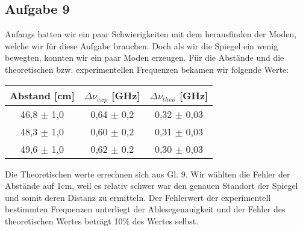 \subsection{Aufgabe 9}

Anfangs hatten wir ein paar Schwierigkeiten mit dem herausfinden der Moden, welche wir für diese Aufgabe brauchen. Doch als wir die Spiegel ein wenig bewegten, konnten wir ein paar Moden erzeugen.
Für die Abstände und die theoretischen bzw. experimentellen Frequenzen bekamen wir folgende Werte:

\begin{center}
\begin{tabular}{c | c | c}
Abstand [cm] & $\Delta \nu_{exp}$ [GHz] & $\Delta \nu_{theo}$ [GHz]\\ \hline
46,8 $\pm$ 1,0 & 0,64 $\pm$ 0,2 & 0,32 $\pm$ 0,03 \\ 
48,3 $\pm$ 1,0 & 0,60 $\pm$ 0,2 & 0,31 $\pm$ 0,03\\
49,6 $\pm$ 1,0 & 0,62 $\pm$ 0,2 & 0,30 $\pm$ 0,03\\
\end{tabular}
\end{center}

Die Theoretischen werte errechnen sich aus Gl. 9. Wir wählten die Fehler der Abstände auf 1cm, weil es relativ schwer war den genauen Standort der Spiegel und somit deren Distanz zu ermitteln. Der Fehlerwert der experimentell bestimmten Frequenzen unterliegt der Ablesegenauigkeit und der Fehler des theoretischen Wertes beträgt 10$\%$ des Wertes selbst.